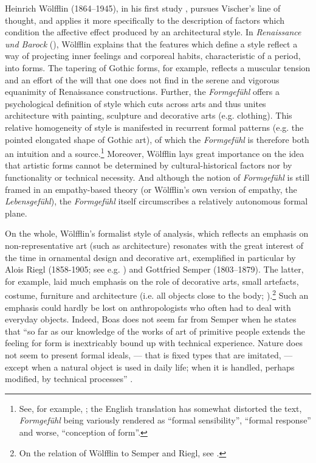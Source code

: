 \documentclass[output=paper]{langscibook}
\begin{document}
Heinrich Wölfflin (1864--1945), in his first study \citet{Wolfflin1886}, pursues Vischer's line of thought, and applies it more specifically to the description of factors which condition the affective effect produced by an architectural style. In \emph{Renaissance und Barock} (\citeyear{Wolfflin1888}), Wölfflin explains that the features which define a style reflect a way of projecting inner feelings and corporeal habits, characteristic of a period, into forms. The tapering of Gothic forms, for example, reflects a muscular tension and an effort of the will that one does not find in the serene and vigorous equanimity of Renaissance  constructions. Further, the \emph{Formgefühl} offers a psychological definition of style which cuts across arts and thus unites architecture with painting, sculpture and decorative arts (e.g. clothing). This relative homogeneity of style is manifested in recurrent formal patterns (e.g. the pointed elongated shape of Gothic art), of which the \emph{Formgefühl} is therefore both an intuition and a source.\footnote{See, for example, \citet[ch. 3]{Wolfflin1888}; the English translation has somewhat distorted the text, \emph{Formgefühl} being variously rendered as ``formal sensibility'', ``formal response'' and worse, ``conception of form''.} Moreover, Wölfflin lays great importance on the idea that artistic forms cannot be determined by cultural-historical factors nor by functionality or technical necessity. And although the notion of \emph{Formgefühl} is still framed in an empathy-based theory (or Wölfflin's own version of empathy, the \emph{Lebensgefühl}), the \emph{Formgefühl} itself circumscribes a relatively autonomous formal plane.

On the whole, Wölfflin's formalist style of analysis, which reflects an emphasis on non-representative art (such as architecture) resonates with the great interest of the time in ornamental design and decorative art, exemplified in particular by Alois Riegl (1858-1905; see e.g. \citealt{Riegl1893}) and Gottfried Semper (1803--1879). The latter, for example, laid much emphasis on the role of decorative arts, small artefacts, costume, furniture and architecture (i.e. all objects close to the body; \citealt{Semper1884}).\footnote{On the relation of Wölfflin to Semper and Riegl, see \citet{Payne2012}.} Such an emphasis could hardly be lost on anthropologists who often had to deal with everyday objects. Indeed, Boas does not seem far from Semper when he states that ``so far as our knowledge of the works of art of primitive people extends the feeling for form is inextricably bound up with technical experience. Nature does not seem to present formal ideals, — that is fixed types that are imitated, — except when a natural object is used in daily life; when it is handled, perhaps modified, by technical processes'' \citep[11]{Boas1927}.
\end{document}
